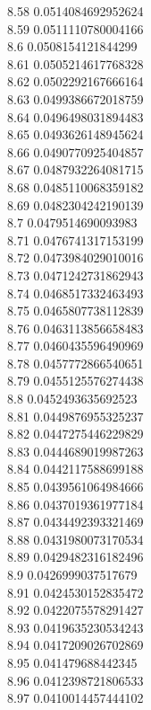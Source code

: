 {8.58	0.0514084692952624\\
8.59	0.0511110780004166\\
8.6	0.0508154121844299\\
8.61	0.0505214617768328\\
8.62	0.0502292167666164\\
8.63	0.0499386672018759\\
8.64	0.0496498031894483\\
8.65	0.0493626148945624\\
8.66	0.0490770925404857\\
8.67	0.0487932264081715\\
8.68	0.0485110068359182\\
8.69	0.0482304242190139\\
8.7	0.0479514690093983\\
8.71	0.0476741317153199\\
8.72	0.0473984029010016\\
8.73	0.0471242731862943\\
8.74	0.0468517332463493\\
8.75	0.0465807738112839\\
8.76	0.0463113856658483\\
8.77	0.0460435596490969\\
8.78	0.0457772866540651\\
8.79	0.0455125576274438\\
8.8	0.0452493635692523\\
8.81	0.0449876955325237\\
8.82	0.0447275446229829\\
8.83	0.0444689019987263\\
8.84	0.0442117588699188\\
8.85	0.0439561064984666\\
8.86	0.0437019361977184\\
8.87	0.0434492393321469\\
8.88	0.0431980073170534\\
8.89	0.0429482316182496\\
8.9	0.0426999037517679\\
8.91	0.0424530152835472\\
8.92	0.0422075578291427\\
8.93	0.0419635230534243\\
8.94	0.0417209026702869\\
8.95	0.041479688442345\\
8.96	0.0412398721806533\\
8.97	0.0410014457444102\\
}
